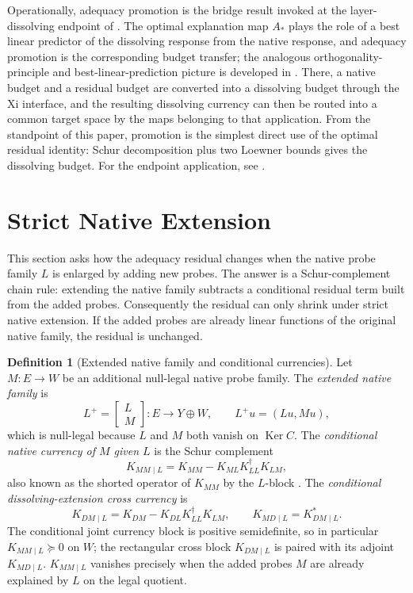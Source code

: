 \documentclass[11pt]{article}
\DeclareMathOperator{\Ker}{Ker}
\theoremstyle{definition}
\newtheorem{definition}[theorem]{Definition}
\begin{document}
Operationally, adequacy promotion is the bridge result invoked at the
layer-dissolving endpoint of \citet{Tsiokos2026NeedleKiller}.  The optimal explanation map \(A_*\)
plays the role of a best linear predictor of the dissolving response from the
native response, and adequacy promotion is the corresponding budget transfer;
the analogous orthogonality-principle and best-linear-prediction picture is
developed in \citet{KailathSayedHassibi2000LinearEstimation}.
There, a native budget and a residual budget are converted into a dissolving
budget through the Xi interface, and the resulting dissolving currency can then be routed into a
common target space by the maps belonging to that application.  From the
standpoint of this paper, promotion is the simplest direct use of the optimal
residual identity: Schur decomposition plus two Loewner bounds gives the
dissolving budget.  For the endpoint application, see
\citet{Tsiokos2026NeedleKiller}.
 \section{Strict Native Extension}
\label{sec:chain-rule}

This section asks how the adequacy residual changes when the native probe
family \(L\) is enlarged by adding new probes.  The answer is a Schur-complement
chain rule: extending the native family subtracts a conditional residual term
built from the added probes.  Consequently the residual can only shrink under
strict native extension.  If the added probes are already linear functions of
the original native family, the residual is unchanged.

\begin{definition}[Extended native family and conditional currencies]\label{def:xi:extended-native-family}
Let \(M\colon E\to W\) be an additional null-legal native probe family.  The
\emph{extended native family} is
\[
  L^+
  =
  \begin{bmatrix}
    L\\
    M
  \end{bmatrix}
  \colon E\to Y\oplus W,
  \qquad
  L^+u=(Lu,Mu),
\]
which is null-legal because \(L\) and \(M\) both vanish on \(\Ker C\).  The
\emph{conditional native currency of \(M\) given \(L\)} is the Schur complement
\[
  K_{MM\mid L}
  =
  K_{MM}-K_{ML}K_{LL}^\dagger K_{LM},
\]
also known as the shorted operator of \(K_{MM}\) by the \(L\)-block
\citep{AndersonWN1971Shorted,AndersonTrapp1975ShortedII}.  The
\emph{conditional dissolving-extension cross currency} is
\[
  K_{DM\mid L}
  =
  K_{DM}-K_{DL}K_{LL}^\dagger K_{LM},
  \qquad
  K_{MD\mid L}=K_{DM\mid L}^*.
\]
The conditional joint currency block is positive semidefinite, so in
particular \(K_{MM\mid L}\succeq 0\) on \(W\); the rectangular cross
block \(K_{DM\mid L}\) is paired with its adjoint \(K_{MD\mid L}\).
\(K_{MM\mid L}\) vanishes precisely when the added probes \(M\) are
already explained by \(L\) on the legal quotient.
\end{definition}
\end{document}
